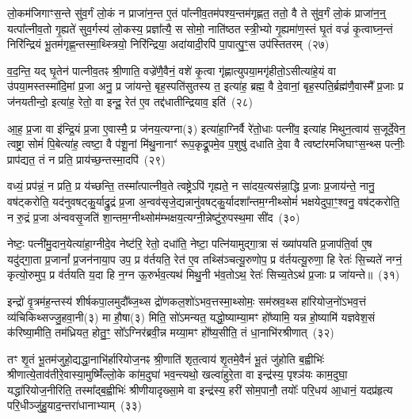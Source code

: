 लो॒कम॑जिगाꣳस॒न्ते सु॑व॒र्गं लो॒कं न प्राजा॑न॒न्त ए॒तं पा᳚त्नीव॒तम॑पश्य॒न्तम॑गृह्णत॒ ततो॒ वै ते सु॑व॒र्गं लो॒कं प्राजा॑न॒न्॒ यत्पा᳚त्नीव॒तो गृ॒ह्यते॑ सुव॒र्गस्य॑ लो॒कस्य॒ प्रज्ञा᳚त्यै॒ स सोमो॒ नाति॑ष्ठत स्त्री॒भ्यो गृ॒ह्यमा॑ण॒स्तं घृ॒तं वज्रं॑ कृ॒त्वाघ्न॒न्तं निरि॑न्द्रियं भू॒तम॑गृह्ण॒न्तस्मा॒थ्स्त्रियो॒ निरि॑न्द्रिया॒ अदा॑यादी॒रपि॑ पा॒पात्पु॒ꣳ॒स उप॑स्तितरम्~(२७)

व॒द॒न्ति॒ यद् घृ॒तेन॑ पात्नीव॒तꣴ श्री॒णाति॒ वज्रे॑णै॒वैनं॒ वशे॑ कृ॒त्वा गृ॑ह्णात्युपया॒मगृ॑हीतो॒\-ऽसीत्या॑हे॒यं वा उ॑पया॒मस्तस्मा॑दि॒मां प्र॒जा अनु॒ प्र जा॑यन्ते॒ बृह॒स्पति॑सुतस्य त॒ इत्या॑ह॒ ब्रह्म॒ वै दे॒वानां॒ बृह॒स्पति॒र्ब्रह्म॑णै॒वास्मै᳚ प्र॒जाः प्र ज॑नयतीन्दो॒ इत्या॑ह॒ रेतो॒ वा इन्दू॒ रेत॑ ए॒व तद्द॑धातीन्द्रियाव॒ इति॑~(२८)

आ॒ह॒ प्र॒जा वा इ॑न्द्रि॒यं प्र॒जा ए॒वास्मै॒ प्र ज॑नय॒त्यग्ना(३) इत्या॑हा॒ग्निर्वै रे॑तो॒धाः पत्नी॑व॒ इत्या॑ह मिथुन॒त्वाय॑ स॒जूर्दे॒वेन॒ त्वष्ट्रा॒ सोमं॑ पि॒बेत्या॑ह॒ त्वष्टा॒ वै प॑शू॒नां मि॑थु॒नानाꣳ॑ रूप॒कृद्रू॒पमे॒व प॒शुषु॑ दधाति दे॒वा वै त्वष्टा॑रमजिघाꣳस॒न्थ्स पत्नीः॒ प्राप॑द्यत॒ तं न प्रति॒ प्राय॑च्छ॒न्तस्मा॒दपि॑~(२९)

वध्यं॒ प्रप॑न्नं॒ न प्रति॒ प्र य॑च्छन्ति॒ तस्मा᳚त्पात्नीव॒ते त्वष्ट्रे\-ऽपि॑ गृह्यते॒ न सा॑दय॒त्यस॑न्ना॒द्धि प्र॒जाः प्र॒जाय॑न्ते॒ नानु॒ वष॑ट्करोति॒ यद॑नुवषट्कु॒र्याद्रु॒द्रं प्र॒जा अ॒न्वव॑सृजे॒द्यन्नानु॑वषट्कु॒र्यादशा᳚न्तम॒ग्नीथ्सोमं॑ भक्षयेदुपा॒ꣳ॒श्वनु॒ वष॑ट्करोति॒ न रु॒द्रं प्र॒जा अ॑न्ववसृ॒जति॑ शा॒न्तम॒ग्नीथ्सोम॑म्भक्षय॒त्यग्नी॒न्नेष्टु॑रु॒पस्थ॒मा सी॑द~(३०)

नेष्टः॒ पत्नी॑मु॒दान॒येत्या॑हा॒ग्नीदे॒व नेष्ट॑रि॒ रेतो॒ दधा॑ति॒ नेष्टा॒ पत्नि॑यामुद्गा॒त्रा सं ख्या॑पयति प्र॒जा\-प॑ति॒र्वा ए॒ष यदु॑द्गा॒ता प्र॒जानां᳚ प्र॒जन॑नाया॒प उप॒ प्र व॑र्तयति॒ रेत॑ ए॒व तथ्सि॑ञ्चत्यू॒रुणोप॒ प्र व॑र्तयत्यू॒रुणा॒ हि रेतः॑ सि॒च्यते॑ नग्नं॒ कृत्यो॒रुमुप॒ प्र व॑र्तयति य॒दा हि न॒ग्न ऊ॒रुर्भव॒त्यथ॑ मिथु॒नी भ॑व॒तो\-ऽथ॒ रेतः॑ सिच्य॒ते\-ऽथ॑ प्र॒जाः प्र जा॑यन्ते॥~(३१)

{\anuvakamend[{पत्नीः᳚ सुव॒र्गमुप॑स्तितरमिन्द्रियाव॒ इत्यपि॑ सीद मिथु॒न्य॑ष्टौ च॑}]}%

इन्द्रो॑ वृ॒त्रम॑ह॒न्तस्य॑ शीर्\mbox{}षकपा॒लमुदौ᳚ब्ज॒थ्स द्रो॑णकल॒शो॑\-ऽभव॒त्तस्मा॒थ्सोमः॒ सम॑स्रव॒थ्स हा॑रियोज॒नो॑\-ऽभव॒त्तं व्य॑चिकिथ्सज्जु॒हवा॒नी(३) मा हौ॒षा(३) मिति॒ सो॑\-ऽमन्यत॒ यद्धो॒ष्याम्या॒मꣳ हो᳚ष्यामि॒ यन्न हो॒ष्यामि॑ यज्ञवेश॒सं क॑रिष्या॒मीति॒ तम॑ध्रियत॒ होतु॒ꣳ॒ सो᳚\-ऽग्निर॑ब्रवी॒न्न मय्या॒मꣳ हो᳚ष्य॒सीति॒ तं धा॒नाभि॑रश्रीणात्~(३२)

तꣳ शृ॒तं भू॒तम॑जुहो॒द्यद्धा॒नाभि॑र्\mbox{}हारियोज॒नꣴ श्री॒णाति॑ शृत॒त्वाय॑ शृ॒तमे॒वैनं॑ भू॒तं जु॑होति ब॒ह्वीभिः॑ श्रीणात्ये॒ताव॑ती\-रे॒वास्या॒मुष्मिँ॑ल्लो॒के का॑म॒दुघा॑ भव॒न्त्यथो॒ खल्वा॑हुरे॒ता वा इन्द्र॑स्य॒ पृश्ञ॑यः काम॒दुघा॒ यद्धा॑रियोज॒नीरिति॒ तस्मा᳚द्ब॒ह्वीभिः॑ श्रीणीयादृख्सा॒मे वा इन्द्र॑स्य॒ हरी॑ सोम॒पानौ॒ तयोः᳚ परि॒धय॑ आ॒धानं॒ यदप्र॑हृत्य परि॒धीञ्जु॑हु॒याद॒न्तरा॑धानाभ्याम्~(३३)

